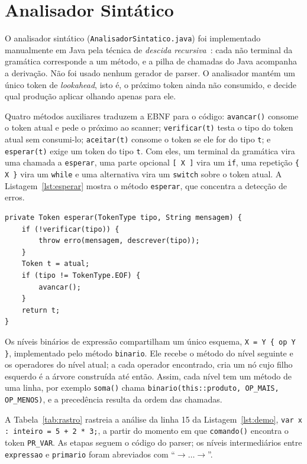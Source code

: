 \documentclass[conference,a4paper]{IEEEtran}
\newcommand{\cod}[1]{\texttt{#1}}
\begin{document}
\section{Analisador Sintático}

O analisador sintático (\cod{AnalisadorSintatico.java}) foi implementado manualmente em Java pela técnica de \emph{descida recursiva}~\cite{aho2006,wirth1996}: cada não terminal da gramática corresponde a um método, e a pilha de chamadas do Java acompanha a derivação. Não foi usado nenhum gerador de parser. O analisador mantém um único token de \emph{lookahead}, isto é, o próximo token ainda não consumido, e decide qual produção aplicar olhando apenas para ele.

Quatro métodos auxiliares traduzem a EBNF para o código: \cod{avancar()} consome o token atual e pede o próximo ao scanner; \cod{verificar(t)} testa o tipo do token atual sem consumi-lo; \cod{aceitar(t)} consome o token se ele for do tipo \cod{t}; e \cod{esperar(t)} exige um token do tipo \cod{t}. Com eles, um terminal da gramática vira uma chamada a \cod{esperar}, uma parte opcional \cod{[ X ]} vira um \cod{if}, uma repetição \cod{\{ X \}} vira um \cod{while} e uma alternativa vira um \cod{switch} sobre o token atual. A Listagem~\ref{lst:esperar} mostra o método \cod{esperar}, que concentra a detecção de erros.

\begin{lstlisting}[float=tb,style=java,basicstyle=\ttfamily\scriptsize,caption={Método \cod{esperar} (código real)},label={lst:esperar}]
private Token esperar(TokenType tipo, String mensagem) {
    if (!verificar(tipo)) {
        throw erro(mensagem, descrever(tipo));
    }
    Token t = atual;
    if (tipo != TokenType.EOF) {
        avancar();
    }
    return t;
}
\end{lstlisting}

Os níveis binários de expressão compartilham um único esquema, \cod{X = Y \{ op Y \}}, implementado pelo método \cod{binario}. Ele recebe o método do nível seguinte e os operadores do nível atual; a cada operador encontrado, cria um nó cujo filho esquerdo é a árvore construída até então. Assim, cada nível tem um método de uma linha, por exemplo \cod{soma()} chama \cod{binario(this::produto, OP\_MAIS, OP\_MENOS)}, e a precedência resulta da ordem das chamadas.

A Tabela~\ref{tab:rastro} rastreia a análise da linha 15 da Listagem~\ref{lst:demo}, \cod{var x : inteiro = 5 + 2 * 3;}, a partir do momento em que \cod{comando()} encontra o token \cod{PR\_VAR}. As etapas seguem o código do parser; os níveis intermediários entre \cod{expressao} e \cod{primario} foram abreviados com ``$\rightarrow\ldots\rightarrow$''.
\end{document}
